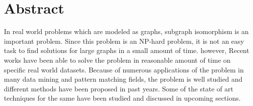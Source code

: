 \documentclass[
10pt, %
a4paper, %
oneside, %
headinclude,footinclude, %
BCOR5mm, %
]{scrartcl}
\title{\normalfont\spacedallcaps{Initial Report on Dynamic Subgraph Isomorphism}} %
\author{\spacedlowsmallcaps{Shreyas Phanse}} %
\date{} %
\begin{document}

\renewcommand{\sectionmark}[1]{\markright{\spacedlowsmallcaps{#1}}} %
\lehead{\mbox{\llap{\small\thepage\kern1em\color{halfgray} \vline}\color{halfgray}\hspace{0.5em}\rightmark\hfil}} %

\pagestyle{scrheadings} %


\maketitle %

\setcounter{tocdepth}{2} %

\tableofcontents %

\listoffigures %



\section*{Abstract} %

In real world problems which are modeled as graphs, subgraph isomorphism is an important problem. Since this problem is an NP-hard problem, it is not an easy task to find solutions for large graphs in a small amount of time. however, Recent works have been able to solve the problem in reasonable amount of time on specific real world datasets. Because of numerous applications of the problem in many data mining and pattern matching fields, the problem is well studied and different methods have been proposed in past years. Some of the state of art techniques for the same have been studied and discussed in upcoming sections.
\end{document}
